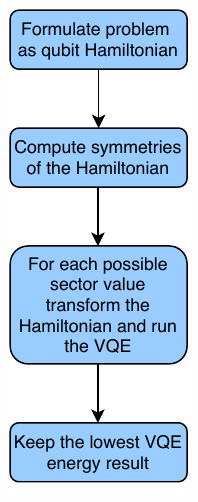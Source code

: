 \documentclass[journal,onecolumn]{IEEEtran}
\begin{document}
\begin{figure}[!htb]
\begin{subfigure}[b]{0.4\textwidth}
    \caption{}
    \label{fig:workflow_vqe_adapt}
  \end{subfigure}
  \begin{subfigure}[b]{0.15\textwidth}
    \centering
    \includegraphics[width=0.9\linewidth]{workflow_vqe_tapering.pdf}

\end{subfigure}
\end{figure}
\end{document}
